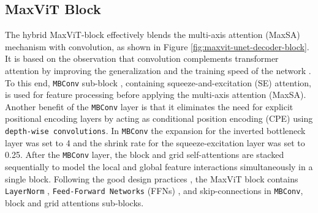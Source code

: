 \documentclass{article}
\begin{document}
\begin{table}[ht!]
\end{table}

\subsection{MaxViT Block}\label{MaxViT Block}

The hybrid MaxViT-block effectively blends the multi-axis attention (MaxSA) mechanism with convolution, as shown in Figure \ref{fig:maxvit-unet-decoder-block}. It is based on the observation that convolution complements transformer attention by improving the generalization and the training speed of the network \cite{xiao2021early}. To this end, \texttt{MBConv} sub-block \cite{sandler2018mobilenetv2}, containing squeeze-and-excitation (SE) \cite{hu2018squeeze} attention, is used for feature processing before applying the multi-axis attention (MaxSA). Another benefit of the \texttt{MBConv} layer is that it eliminates the need for explicit positional encoding layers by acting as conditional position encoding (CPE) \cite{chu2023conditional} using \texttt{depth-wise convolutions}. In \texttt{MBConv} the expansion for the inverted bottleneck layer was set to 4 and the shrink rate for the squeeze-excitation layer was set to 0.25. After the \texttt{MBConv} layer, the block and grid self-attentions are stacked sequentially to model the local and global feature interactions simultaneously in a single block. Following the good design practices \cite{dosovitskiy2021an,cao2022swin}, the MaxViT block contains \texttt{LayerNorm} \cite{ba2016layer}, \texttt{Feed-Forward Networks} (FFNs) \cite{dosovitskiy2021an,cao2022swin}, and skip-connections in \texttt{MBConv}, block and grid attentions sub-blocks.
\end{document}

